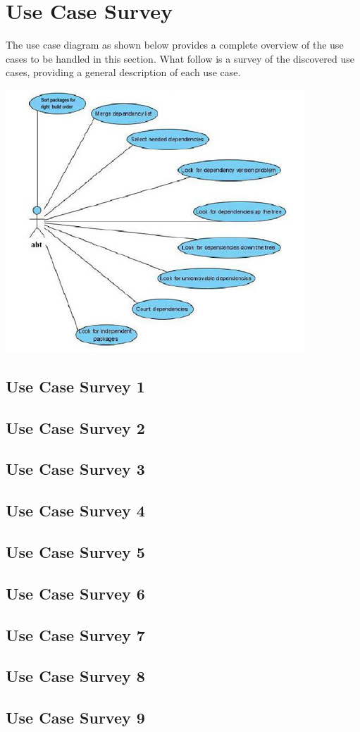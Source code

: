 \newpage

\section{Use Case Survey}
The use case diagram as shown below provides a complete overview of the use cases to be handled in this section. What follow is a survey of the discovered use cases, providing a general description of each use case.

\medskip

\includegraphics{ucd.jpg}

\subsection{Use Case Survey 1}

\subsection{Use Case Survey 2}

\subsection{Use Case Survey 3}

\subsection{Use Case Survey 4}

\subsection{Use Case Survey 5}

\subsection{Use Case Survey 6}

\subsection{Use Case Survey 7}

\subsection{Use Case Survey 8}

\subsection{Use Case Survey 9}

